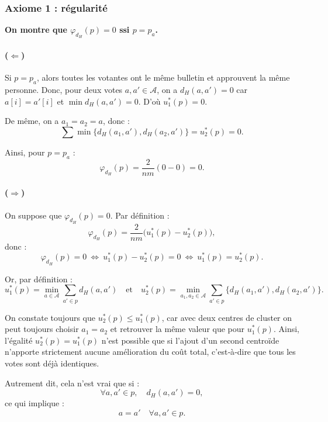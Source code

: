 \documentclass[11pt]{article}
\begin{document}
\subsubsection{Axiome 1 : régularité}


\textbf{On montre que $\varphi_{d_H}(p) = 0$ ssi $p = p_a$.}

\paragraph{($\Leftarrow$)}  
Si $p = p_a$, alors toutes les votantes ont le même bulletin et approuvent la même personne.  
Donc, pour deux votes $a,a' \in \mathcal{A}$, on a $d_H(a,a') = 0$ car $a[i] = a'[i]$ et 
$\min d_H(a,a') = 0$. D'où $u_1^*(p) = 0$.

De même, on a $a_1 = a_2 = a$, donc :
\[
\sum \min \{d_H(a_1,a'), d_H(a_2,a')\} = u_2^*(p) = 0.
\]

Ainsi, pour $p = p_a$ :
\[
\varphi_{d_H}(p) = \frac{2}{n m}(0 - 0) = 0.
\]

\paragraph{($\Rightarrow$)} 

On suppose que $\varphi_{d_H}(p) = 0$.  
Par définition :
\[
\varphi_{d_H}(p) = \frac{2}{n m}\big(u_1^*(p) - u_2^*(p)\big),
\]
donc :
\[
\varphi_{d_H}(p) = 0 
\ \Leftrightarrow\ 
u_1^*(p) - u_2^*(p) = 0
\ \Leftrightarrow\ 
u_1^*(p) = u_2^*(p).
\]

Or, par définition :
\[
u_1^*(p) = \min_{a \in \mathcal{A}} \sum_{a' \in p} d_H(a, a')
\quad \text{et} \quad
u_2^*(p) = \min_{a_1, a_2 \in \mathcal{A}} 
\sum_{a' \in p} \{ d_H(a_1, a'), d_H(a_2, a') \}.
\]

On constate toujours que $u_2^*(p) \le u_1^*(p)$, car avec deux centres de cluster on peut toujours choisir $a_1=a_2$ et retrouver la même valeur que pour $u_1^*(p)$.  
Ainsi, l’égalité $u_2^*(p)=u_1^*(p)$ n’est possible que si l’ajout d’un second centroïde n’apporte strictement aucune amélioration du coût total, c’est‑à‑dire que tous les votes sont déjà identiques.

Autrement dit, cela n’est vrai que si :
\[
\forall a, a' \in p, \quad d_H(a, a') = 0,
\]
ce qui implique :
\[
a = a' \quad \forall a, a' \in p.
\]
\end{document}
